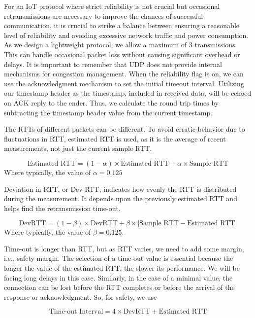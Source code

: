\documentclass[lettersize,journal]{IEEEtran}
\begin{document}
For an IoT protocol where strict reliability is not crucial but occasional retransmissions are necessary to improve the chances of successful communication, it is crucial to strike a balance between ensuring a reasonable level of reliability and avoiding excessive network traffic and power consumption. As we design a lightweight protocol, we allow a maximum of 3 transmissions. This can handle occasional packet loss without causing significant overhead or delays. It is important to remember that UDP does not provide internal mechanisms for congestion management.  When the reliability flag is on, we can use the acknowledgment mechanism to set the initial timeout interval. Utilizing our timestamp header as the timestamp, included in received data, will be echoed on ACK reply to the ender. Thus, we calculate the round trip times by subtracting the timestamp header value from the current timestamp. 

The RTTs of different packets can be different. To avoid erratic behavior due to fluctuations in RTT, estimated RTT is used, as it is the average of recent measurements, not just the current sample RTT.

\begin{equation}
\text{Estimated RTT} = (1-\alpha) \times \text{Estimated RTT} + \alpha \times \text{Sample RTT}
\end{equation}
Where typically, the value of $\alpha = 0.125$

Deviation in RTT, or Dev-RTT, indicates how evenly the RTT is distributed during the measurement. It depends upon the previously estimated RTT and helps find the retransmission time-out.

\begin{equation}
\text{DevRTT} = (1-\beta) \times \text{DevRTT} + \beta \times |\text{Sample RTT} - \text{Estimated RTT}|
\end{equation}
Where typically, the value of $\beta = 0.125$.

Time-out is longer than RTT, but as RTT varies, we need to add some margin, i.e., safety margin. The selection of a time-out value is essential because the longer the value of the estimated RTT, the slower its performance. We will be facing long delays in this case. Similarly, in the case of a minimal value, the connection can be lost before the RTT completes or before the arrival of the response or acknowledgment. So, for safety, we use

\begin{equation}
\text{Time-out Interval} = 4 \times \text{DevRTT} + \text{Estimated RTT}
\end{equation}

\nocite{*}


\end{document}
